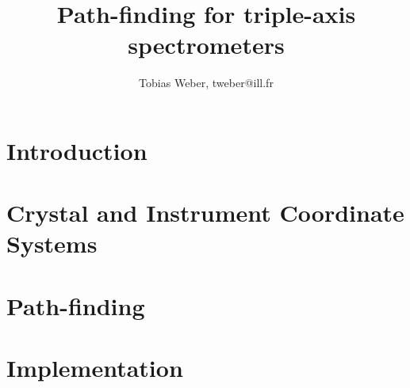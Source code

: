 \documentclass[english, 11pt]{book}
\begin{document}
\newcommand{\ill}{Institut Laue-Langevin (ILL), 71 avenue des Martyrs, CS 20156, 38042 Grenoble cedex 9, France}
\newcommand{\fuh}{Fernuniversit\"at in Hagen (FUH), Universit\"atsstraße 47, 58097 Hagen, Germany}


\title{Path-finding for triple-axis spectrometers}
\author{Tobias Weber, tweber@ill.fr}

\maketitle
\tableofcontents









\chapter{Introduction}


\chapter{Crystal and Instrument Coordinate Systems}
\label{ch:xtal}


\chapter{Path-finding}


\chapter{Implementation}


\appendix






\end{document}
